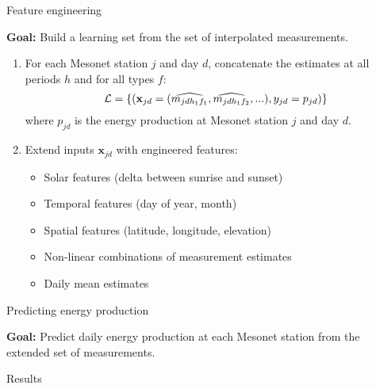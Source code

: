 \documentclass[handout]{beamer}
\begin{document}

\begin{frame}{Feature engineering}

\textbf{Goal:} Build a learning set from the set of interpolated measurements.

\begin{enumerate}

\item For each Mesonet station $j$ and day $d$, concatenate the estimates at all periods $h$ and for all types $f$: $${\cal L} = \{ (\mathbf{x}_{jd} = (\widehat{m_{jd{h_1}{f_1}}}, \widehat{m_{jd{h_1}{f_2}}}, ...), y_{jd} = p_{jd}) \}$$ where $p_{jd}$ is the energy production at Mesonet station $j$ and day $d$.

\item Extend inputs $\mathbf{x}_{jd}$ with engineered features:
\begin{itemize}
\item Solar features (delta between sunrise and sunset)
\item Temporal features (day of year, month)
\item Spatial features (latitude, longitude, elevation)
\item Non-linear combinations of measurement estimates
\item Daily mean estimates
\end{itemize}

\end{enumerate}

\end{frame}



\begin{frame}{Predicting energy production}

\textbf{Goal:} Predict daily energy production at each Mesonet station from the extended set of measurements.

\end{frame}



\begin{frame}{Results}

\end{frame}
\end{document}
